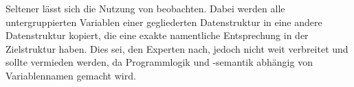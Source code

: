 Seltener lässt sich die Nutzung von  beobachten. Dabei werden alle untergruppierten Variablen einer gegliederten Datenstruktur in eine andere Datenstruktur kopiert, die eine exakte namentliche Entsprechung in der Zielstruktur haben. Dies sei, den Experten nach, jedoch nicht weit verbreitet und sollte vermieden werden, da Programmlogik und -semantik abhängig von Variablennamen gemacht wird.